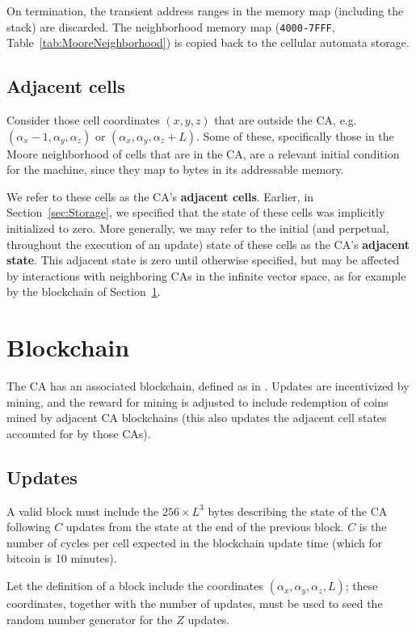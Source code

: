 \documentclass{article}
\newcommand\hex[1]{{\tt #1}}
\newcommand\hexrange[2]{\hex{#1}{\tt -}\hex{#2}}
\begin{document}
On termination, the transient address ranges in the memory map
(including the stack)
are discarded.
The neighborhood memory map (\hexrange{4000}{7FFF}, Table~\ref{tab:MooreNeighborhood})
is copied back to the cellular automata storage.

\subsection{Adjacent cells}
\label{sec:AdjacentCells}

Consider those cell coordinates $(x,y,z)$ that are outside the CA,
e.g. $(\alpha_x-1,\alpha_y,\alpha_z)$ or  $(\alpha_x,\alpha_y,\alpha_z + L)$.
Some of these, specifically those in the Moore neighborhood of cells that are in the CA,
are a relevant initial condition for the machine,
since they map to bytes in its addressable memory.

We refer to these cells as the CA's {\bf adjacent cells}.
Earlier, in Section~\ref{sec:Storage}, we specified that the state of these cells was implicitly initialized to zero.
More generally, we may refer to the initial (and perpetual, throughout the execution of an update)
state of these cells as the CA's {\bf adjacent state}.
This adjacent state is zero until otherwise specified, but may be affected
by interactions with neighboring CAs in the infinite vector space,
as for example by the blockchain of Section~\ref{sec:Blockchain}.

\section{Blockchain}
\label{sec:Blockchain}

The CA has an associated blockchain, defined as in \cite{Nakamoto2008}.
Updates are incentivized by mining,
and the reward for mining is adjusted to include redemption of coins mined by adjacent CA blockchains
(this also updates the adjacent cell states accounted for by those CAs).

\subsection{Updates}

A valid block must include the $256 \times L^3$ bytes describing the state of the CA following $C$ updates
from the state at the end of the previous block.
$C$ is the number of cycles per cell expected in the blockchain update time
(which for bitcoin is 10 minutes).

Let the definition of a block include the coordinates $(\alpha_x,\alpha_y,\alpha_z,L)$;
these coordinates, together with the number of updates,
must be used to seed the random number generator for the $Z$ updates.
\end{document}
